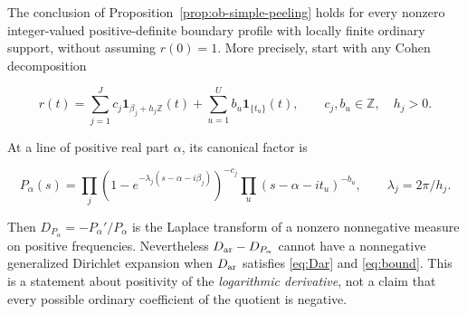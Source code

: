 \begin{proposition}\label{prop:ob-peeling}

The conclusion of Proposition~\ref{prop:ob-simple-peeling} holds for every nonzero integer-valued positive-definite boundary profile with locally finite ordinary support, without assuming \(r(0)=1\). More precisely, start with any Cohen decomposition

\begin{equation}\label{eq:ob3-8}
r(t)=\sum_{j=1}^J c_j\mathbf1_{\beta_j+h_j\mathbb Z}(t)
+\sum_{u=1}^U b_u\mathbf1_{\{t_u\}}(t),
\qquad c_j,b_u\in\mathbb Z,\quad h_j>0.
\end{equation}

At a line of positive real part \(\alpha\), its canonical factor is

\begin{equation}\label{eq:ob3-9}
P_\alpha(s)=
\prod_j(1-e^{-\lambda_j(s-\alpha-i\beta_j)})^{-c_j}
\prod_u(s-\alpha-it_u)^{-b_u},
\qquad \lambda_j=2\pi/h_j.
\end{equation}

Then \(D_{P_\alpha}=-P_\alpha'/P_\alpha\) is the Laplace transform of a nonzero nonnegative measure on positive frequencies. Nevertheless \(D_{\rm ar}-D_{P_\alpha}\) cannot have a nonnegative generalized Dirichlet expansion when \(D_{\rm ar}\) satisfies \eqref{eq:Dar} and \eqref{eq:bound}. This is a statement about positivity of the \emph{logarithmic derivative}, not a claim that every possible ordinary coefficient of the quotient is negative.

\end{proposition}


